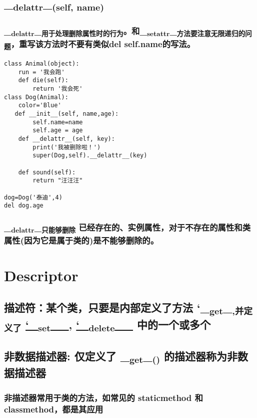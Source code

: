 \documentclass[11pt]{article}
\begin{document}
\subsection{\_\textsubscript{delattr}\_\textsubscript{(self, name)}}
\label{sec:org74354d0}
\subsubsection{\_\textsubscript{delattr}\_\textsubscript{用于处理删除属性时的行为}。和\_\textsubscript{setattr}\_\textsubscript{方法要注意无限递归的问题}，重写该方法时不要有类似del self.name的写法。}
\label{sec:orga197a4b}
\begin{verbatim}
class Animal(object):
    run = '我会跑'
    def die(self):
        return '我会死'
class Dog(Animal):
    color='Blue'
   def __init__(self, name,age):
        self.name=name
        self.age = age
    def __delattr__(self, key):
        print('我被删除啦！')
        super(Dog,self).__delattr__(key)

    def sound(self):
        return "汪汪汪"

dog=Dog('泰迪',4)
del dog.age
\end{verbatim}
\subsubsection{\_\textsubscript{delattr}\_\textsubscript{只能够删除} 已经存在的、实例属性，对于不存在的属性和类属性(因为它是属于类的)是不能够删除的。}
\label{sec:orga0e5439}
\section{Descriptor}
\label{sec:org9f14ab8}
\subsection{描述符：某个类，只要是内部定义了方法 `\_\textsubscript{get}\_\textsubscript{,并定义了} \underline{`\_\textsubscript{set}\_\_}, \underline{`\_\textsubscript{delete}\_\_} 中的一个或多个}
\label{sec:orge75ad99}
\subsection{非数据描述器: 仅定义了 \_\textsubscript{get}\_\textsubscript{()} 的描述器称为非数据描述器}
\label{sec:orgbd37f91}
\subsubsection{非描述器常用于类的方法，如常见的 staticmethod 和 classmethod，都是其应用}
\label{sec:org4ecccda}
\end{document}
